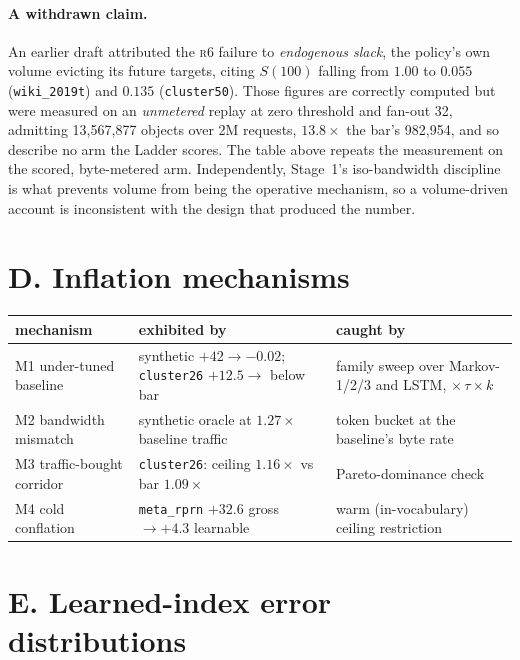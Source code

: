\documentclass[letterpaper]{article} %
\newcommand{\rung}[1]{\textsc{#1}}
\begin{document}
\paragraph{A withdrawn claim.} An earlier draft attributed the \rung{r6} failure to \emph{endogenous
slack}, the policy's own volume evicting its future targets, citing $S(100)$ falling from $1.00$ to
$0.055$ (\texttt{wiki\_2019t}) and $0.135$ (\texttt{cluster50}). Those figures are correctly
computed but were measured on an \emph{unmetered} replay at zero threshold and fan-out 32, admitting
13{,}567{,}877 objects over 2M requests, $13.8\times$ the bar's 982{,}954, and so describe no arm
the Ladder scores. The table above repeats the measurement on the scored, byte-metered arm.
Independently, Stage~1's iso-bandwidth discipline is what prevents volume from being the operative
mechanism, so a volume-driven account is inconsistent with the design that produced the number.

\clearpage
\section{D. Inflation mechanisms}

\begin{table}[htbp]
\centering\footnotesize
\setlength{\tabcolsep}{3pt}
\begin{tabular}{p{1.7cm}p{3.0cm}p{3.05cm}}
\toprule
mechanism & exhibited by & caught by \\
\midrule
M1 under-tuned baseline & synthetic $+42\to-0.02$; \texttt{cluster26} $+12.5\to$ below bar & family sweep over Markov-1/2/3 and LSTM, $\times\,\tau\times k$ \\
M2 bandwidth mismatch & synthetic oracle at $1.27\times$ baseline traffic & token bucket at the baseline's byte rate \\
M3 traffic-bought corridor & \texttt{cluster26}: ceiling $1.16\times$ vs bar $1.09\times$ & Pareto-dominance check \\
M4 cold conflation & \texttt{meta\_rprn} $+32.6$ gross $\to +4.3$ learnable & warm (in-vocabulary) ceiling restriction \\
\bottomrule
\end{tabular}
\label{tab:s-infl}
\end{table}

\section{E. Learned-index error distributions}
\end{document}
